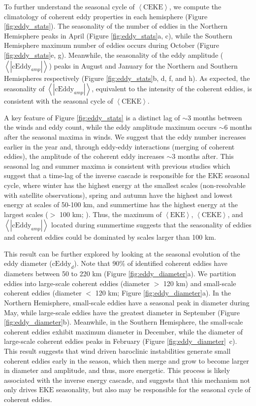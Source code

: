 \documentclass[draft,linenumbers]{agujournal2019}
\newcommand{\EKE}{\textrm{EKE}}
\newcommand{\CEKE}{\textrm{CEKE}}
\newcommand{\cEddy}{\textrm{cEddy}}
\begin{document}
	To further understand the seasonal cycle of $\left<\CEKE\right>$, we compute the climatology of coherent eddy properties in each hemisphere (Figure \ref{fig:eddy_stats}). 
	The seasonality of the number of eddies in the Northern Hemisphere peaks in April (Figure \ref{fig:eddy_stats}a, c), while the Southern Hemisphere maximum number of eddies occurs during October (Figure \ref{fig:eddy_stats}e, g). 
	Meanwhile, the seasonality of the eddy amplitude ($\left<|\cEddy_{amp}|\right>$) peaks in August and January for the Northern and Southern Hemispheres respectively (Figure \ref{fig:eddy_stats}b, d, f, and h). 
	As expected, the seasonality of $\left<|\cEddy_{amp}|\right>$, equivalent to the intensity of the coherent eddies, is consistent with the seasonal cycle of $\left<\CEKE\right>$.

	A key feature of Figure \ref{fig:eddy_stats} is a distinct lag of $\sim$3 months between the winds and eddy count, while the eddy amplitude maximum occurs $\sim$6 months after the seasonal maxima in winds. 
	We suggest that the eddy number increases earlier in the year and, through eddy-eddy interactions (merging of coherent eddies), the amplitude of the coherent eddy increases $\sim$3 months after. This seasonal lag and summer maxima is consistent with previous studies which suggest that a time-lag of the inverse cascade \citep{Sasaki_seasonal_2014, Qiu_seasonal_2014} is responsible for the $\EKE$ seasonal cycle, where winter has the highest energy at the smallest scales (non-resolvable with satellite observations), spring and autumn have the highest and lowest energy at scales of 50-100 km, and summertime has the highest energy at the largest scales ($>$ 100 km; \citealp{Uchida_Seasonality_2017}). 
	Thus, the maximum of $\left<\EKE\right>$, $\left<\CEKE\right>$, and $\left<|\cEddy_{amp}|\right>$ located during summertime suggests that the seasonality of eddies and coherent eddies could be dominated by scales larger than 100 km.

	This result can be further explored by looking at the seasonal evolution of the eddy diameter ($\cEddy_d$). 
	Note that 90\% of identified coherent eddies have diameters between 50 to 220 km (Figure \ref{fig:eddy_diameter}a). We partition eddies into large-scale coherent eddies (diameter $>$ 120 km) and  small-scale coherent eddies (diameter $<$ 120 km; Figure \ref{fig:eddy_diameter}a). 
	In the Northern Hemisphere, small-scale eddies have a seasonal peak in diameter during May, while large-scale eddies have the greatest diameter in September (Figure \ref{fig:eddy_diameter}b).
	Meanwhile, in the Southern Hemisphere, the small-scale coherent eddies exhibit maximum diameter in December, while the diameter of large-scale coherent eddies peaks in February (Figure \ref{fig:eddy_diameter}~c). 
	This result suggests that wind driven baroclinic instabilities generate small coherent eddies early in the season, which then merge and grow to become larger in diameter and amplitude, and thus, more energetic. 
	This process is likely associated with the inverse energy cascade, and suggests that this mechanism not only drives $\EKE$ seasonality, but also may be responsible for the seasonal cycle of coherent eddies. 
\end{document}
